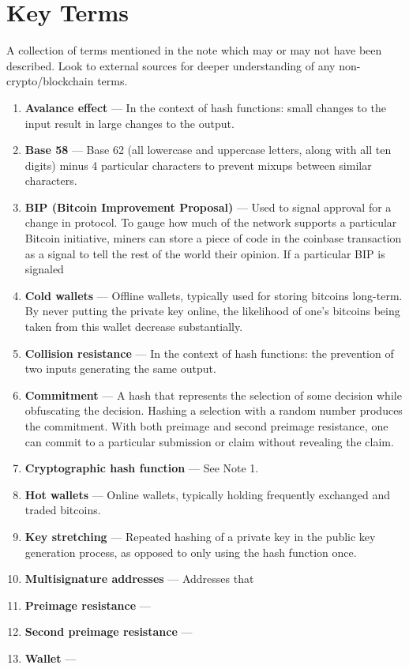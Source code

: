 \documentclass[11pt]{article}
\begin{document}
    \section*{Key Terms}
    \noindent A collection of terms mentioned in the note which may or may not have been described. Look to external sources for deeper understanding of any non-crypto/blockchain terms.
    \begin{enumerate}
        \item \textbf{Avalance effect} --- In the context of hash functions: small changes to the input result in large changes to the output.
        \item \textbf{Base 58} --- Base 62 (all lowercase and uppercase letters, along with all ten digits) minus 4 particular characters to prevent mixups between similar characters.
        \item \textbf{BIP (Bitcoin Improvement Proposal)} --- Used to signal approval for a change in protocol. To gauge how much of the network supports a particular Bitcoin initiative, miners can store a piece of code in the coinbase transaction as a signal to tell the rest of the world their opinion. If a particular BIP is signaled 
        \item \textbf{Cold wallets} --- Offline wallets, typically used for storing bitcoins long-term. By never putting the private key online, the likelihood of one's bitcoins being taken from this wallet decrease substantially.
        \item \textbf{Collision resistance} --- In the context of hash functions: the prevention of two inputs generating the same output.
        \item \textbf{Commitment} --- A hash that represents the selection of some decision while obfuscating the decision. Hashing a selection with a random number produces the commitment. With both preimage and second preimage resistance, one can commit to a particular submission or claim without revealing the claim.
        \item \textbf{Cryptographic hash function} --- See Note 1.
        \item \textbf{Hot wallets} --- Online wallets, typically holding frequently exchanged and traded bitcoins. 
        \item \textbf{Key stretching} --- Repeated hashing of a private key in the public key generation process, as opposed to only using the hash function once.
        \item \textbf{Multisignature addresses} --- Addresses that 
        \item \textbf{Preimage resistance} --- 
        \item \textbf{Second preimage resistance} --- 
        \item \textbf{Wallet} --- 
    \end{enumerate}
\end{document}
